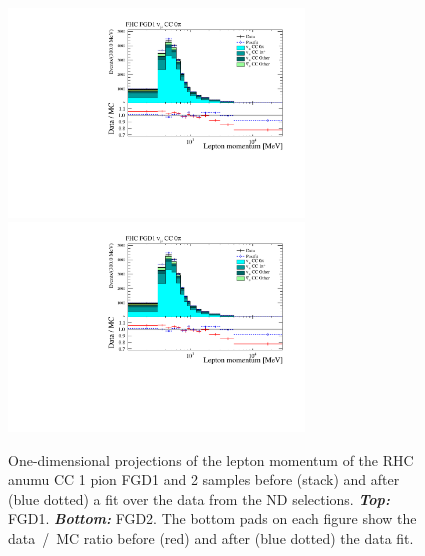 \begin{figure}[ht]
  \center
  \includegraphics[keepaspectratio=true,width=0.7\textwidth,page=8]{images/BANFF/reactionCodeStacks_PrefitAndPostfit_mom.pdf}\\
  \includegraphics[keepaspectratio=true,width=0.7\textwidth,page=11]{images/BANFF/reactionCodeStacks_PrefitAndPostfit_mom.pdf}\\
  \begin{center}
    \caption[RHC $\bar{\nu}_\mu$ CC 1 pion FGD1 and 2 samples before
    and after a fit over the data from the ND280
    selections]{One-dimensional projections of the lepton momentum of
      the \Gls{RHC} \Gls{anumu} \Gls{CC} 1 pion \Gls{FGD}1 and 2
      samples before (stack) and after (blue dotted) a fit over the
      data from the \Gls{ND} selections. \textbf{\textit{Top:}}
      \Gls{FGD}1. \textbf{\textit{Bottom:}} \Gls{FGD}2. The bottom
      pads on each figure show the data~/~\Gls{MC} ratio before (red)
      and after (blue dotted) the data fit.}
    \label{fig:anumuCC1Pi}
  \end{center}
\end{figure}

